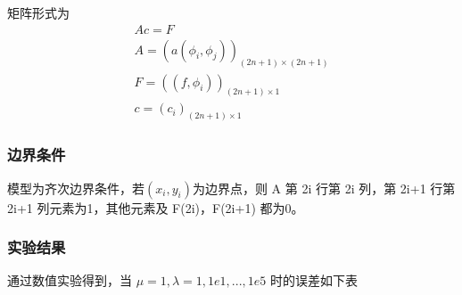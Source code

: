 \documentclass[a4paper,UTF8,titlepage]{ctexart}
\begin{document}
矩阵形式为
$$
\begin{matrix}
	A c = F \\
	A = (a(\phi_i, \phi_j))_{(2n+1) \times (2n+1)} \\
	F = ((f,\phi_i))_{(2n+1) \times 1} \\
	c = (c_i)_{(2n+1) \times 1}
\end{matrix}
$$

%
%

\subsubsection{边界条件}

模型为齐次边界条件，若$(x_i,y_i)$为边界点，则 A 第 2i 行第 2i 列，第 2i+1 行第 2i+1 列元素为1，其他元素及  F(2i)，F(2i+1) 都为0。


%
%

\subsubsection{实验结果}

通过数值实验得到，当 $\mu = 1, \lambda = 1, 1e1, ..., 1e5$ 时的误差如下表
\end{document}
